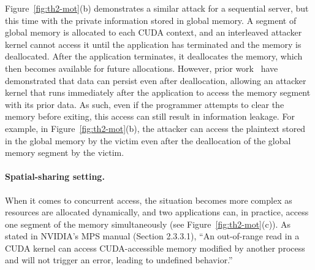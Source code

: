 Figure~\ref{fig:th2-mot}(b) demonstrates a similar attack for a sequential server, but this time with the private information stored in global memory.
%
A segment of global memory is allocated to each CUDA context,  and an interleaved attacker kernel cannot access it until the application has terminated and the memory is deallocated.
%
After the application terminates, it deallocates the memory,  which then becomes available for future allocations.
%
However, prior work~\cite{pietro2016TECS} have demonstrated that data can persist even after deallocation, allowing an attacker kernel that runs immediately after the application to access the memory segment with its prior data. 
%
As such, even if the programmer attempts to clear the memory before exiting, this access can still result in information leakage. 
%
For example, in Figure~\ref{fig:th2-mot}(b), the attacker can access the plaintext stored in the global memory by the victim even after the deallocation of the global memory segment by the victim.

\paragraph{Spatial-sharing setting.}

When it comes to concurrent access, the situation becomes more complex as resources are allocated dynamically, and two applications can, in practice, access one segment of the memory simultaneously (see Figure~\ref{fig:th2-mot}(c)).
%
As stated in NVIDIA's MPS manual (Section 2.3.3.1), ``An out-of-range read in a CUDA kernel can access CUDA-accessible memory modified by another process and will not trigger an error, leading to undefined behavior.'' \cite{hayes2017usenix}



% 
% 
%

